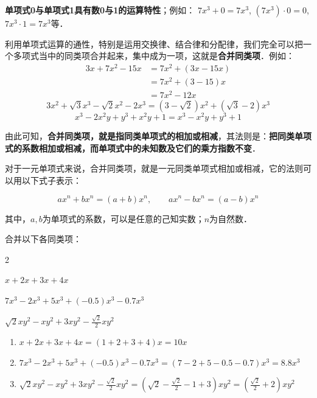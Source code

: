 \textbf{单项式0与单项式1具有数0与1的运算特性}；例如：
$7x^3+0=7x^3$, $(7x^3)\cdot 0=0$, $7x^3\cdot 1=7x^3$等．

利用单项式运算的通性，特别是运用交换律、结合律和分配律，我们完全可以把一个多项式当中的同类项合并起来，集中成为一项，这就是\textbf{合并同类项}．例如：
\begin{align*}
3x+7x^2-15x &= 7x^2+(3x-15x) \tag{交换律，结合律}\\
&=7x^2+(3-15)x \tag{分配律}\\
&=7x^2-12x
\end{align*}
\[3x^2+\sqrt{3}x^3-\sqrt{2}x^2-2x^3=(3-\sqrt{2})x^2+(\sqrt{3}-2)x^3 \]
\[x^3-2x^2y+y^3+x^2y+1=x^3-x^2y+y^3+1 \]

由此可知，\textbf{合并同类项，就是指同类单项式的相加或相减}，其法则是：\textbf{把同类单项式的系数相加或相减，而单项式中的未知数及它们的乘方指数不变}．

对于一元单项式来说，合并同类项，就是一元同类单项式相加或相减，它的法则可以用以下式子表示：
\begin{blk}{}
    \[{ax^n +bx^n = (a+b)x^n,\qquad  ax^n -bx^n =(a-b)x^n}\]
\end{blk}

其中，$a,b$为单项式的系数，可以是任意的己知实数；$n$为自然数．

\begin{example}
    合并以下各同类项：
    \begin{enumerate}
        \begin{multicols}{2}
             \item $x+2x+3x+4x$
        \item $7x^3-2x^3+5x^3+(-0.5)x^3-0.7x^3$
        \item $\sqrt{2}xy^2-xy^2+3xy^2-\frac{\sqrt{2}}{2}xy^2$
        \end{multicols}
    \end{enumerate}
\end{example}

\begin{solution}
    \begin{enumerate}
        \item $x+2x+3x+4x=(1+2+3+4)x=10x$
        \item $7x^3-2x^3+5x^3+(-0.5)x^3-0.7x^3=(7-2+5-0.5-0.7)x^3=8.8x^3$
        \item $\sqrt{2}xy^2-xy^2+3xy^2-\frac{\sqrt{2}}{2}xy^2=\left(\sqrt{2}-\frac{\sqrt{2}}{2}-1+3\right)xy^2=\left(\frac{\sqrt{2}}{2}+2\right)xy^2$
    \end{enumerate}
\end{solution}

